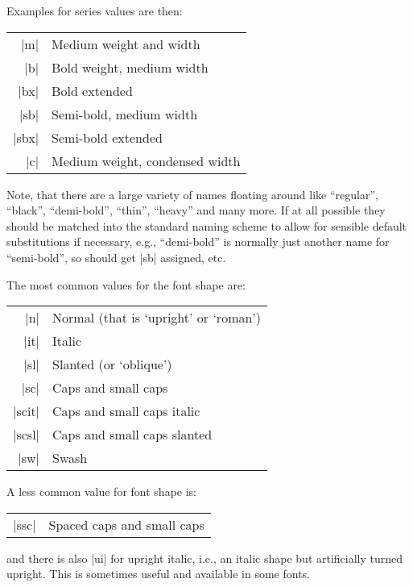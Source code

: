 \documentclass{ltxguide}[1995/11/28]
\begin{document}
Examples for series values are then:
\begin{center}
  \begin{minipage}{.7\linewidth}
    \begin{tabular}{rl}
      |m|   & Medium weight and width  \\
      |b|   & Bold weight, medium width  \\
      |bx|  & Bold extended \\
      |sb|  & Semi-bold, medium width\\
      |sbx| & Semi-bold extended\\
      |c|   & Medium weight, condensed width
    \end{tabular}
  \end{minipage}
\end{center}
Note, that there are a large variety of names floating around like
``regular'', ``black'', ``demi-bold'', ``thin'', ``heavy'' and many
more.  If at all possible they should be matched into the standard
naming scheme to allow for sensible default substitutions if necessary,
e.g., ``demi-bold'' is normally just another name for ``semi-bold'', so
should get |sb| assigned, etc.


The most common values for the font shape are:
\begin{center}
  \begin{minipage}{.7\linewidth}
    \begin{tabular}{rl}
      |n|    & Normal (that is `upright' or `roman') \\
      |it|   & Italic                                \\
      |sl|   & Slanted (or `oblique')                \\
      |sc|   & Caps and small caps                   \\
      |scit| & Caps and small caps italic            \\
      |scsl| & Caps and small caps slanted           \\
      |sw|   & Swash
    \end{tabular}
  \end{minipage}
\end{center}
A less common value for font shape is:
\begin{center}
  \begin{minipage}{.7\linewidth}
    \begin{tabular}{rl}
      |ssc|  & Spaced caps and small caps
    \end{tabular}
  \end{minipage}
\end{center}
and there is also |ui| for upright italic, i.e., an italic shape but
artificially turned upright. This is sometimes useful and available in
some fonts.
\end{document}
